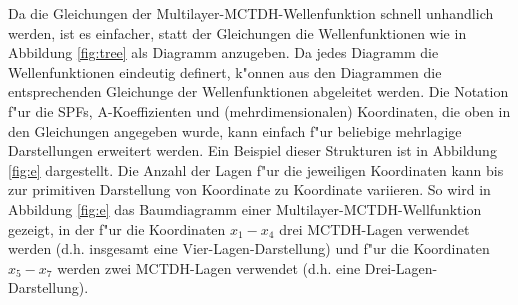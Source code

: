 Da die Gleichungen der Multilayer-MCTDH-Wellenfunktion schnell unhandlich werden, ist es einfacher, statt der Gleichungen die Wellenfunktionen 
wie in Abbildung \ref{fig:tree}
als Diagramm anzugeben. Da jedes Diagramm die Wellenfunktionen eindeutig definert, k"onnen aus den Diagrammen die entsprechenden
Gleichunge der Wellenfunktionen abgeleitet werden.
Die Notation f"ur die SPFs, A-Koeffizienten und (mehrdimensionalen) Koordinaten, die oben in den Gleichungen angegeben wurde,
kann einfach f"ur beliebige mehrlagige Darstellungen erweitert werden. 
Ein Beispiel dieser Strukturen ist in Abbildung \ref{fig:e} dargestellt. 
Die Anzahl der Lagen f"ur die jeweiligen Koordinaten kann bis zur primitiven Darstellung von 
Koordinate zu Koordinate variieren.
So wird in Abbildung \ref{fig:e} das Baumdiagramm einer Multilayer-MCTDH-Wellfunktion gezeigt, 
in der f"ur die Koordinaten $ x_1-x_4 $ drei MCTDH-Lagen verwendet werden 
(d.h. insgesamt eine Vier-Lagen-Darstellung)
und f"ur die Koordinaten $ x_5 - x_7 $  werden zwei MCTDH-Lagen verwendet (d.h. eine Drei-Lagen-Darstellung).

